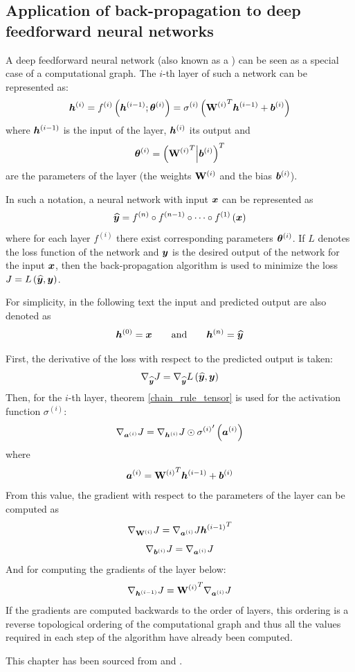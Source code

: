 \begin{example}
\section{Application of back-propagation to deep feedforward neural networks}\label{backprop_application}

A deep feedforward neural network (also known as a ) can be seen as a special case of a computational graph. The \( i \)-th layer of such a network can be represented as:
\[ \bm h^{(i)} = f^{(i)} \left( \bm{h}^{(i - 1)} ; \bm{\theta}^{(i)} \right) = \sigma^{(i)} \left( {\mathbf{W}^{(i)}}^T \bm h^{(i - 1)} + \bm{b}^{(i)} \right) \]
where \( \bm{h}^{(i - 1)} \) is the input of the layer, \( \bm{h}^{(i)} \) its output and
\[ \bm{\theta}^{(i)} = \left( {\mathbf{W}^{(i)}}^T \middle| \bm{b}^{(i)} \right)^T \]
are the parameters of the layer (the weights \( \mathbf{W}^{(i)} \) and the bias \( \bm{b}^{(i)} \)).

In such a notation, a neural network with input \( \bm{x} \) can be represented as
\[ \widehat{\bm{y}} = f^{(n)} \circ f^{(n - 1)} \circ \dots \circ f^{(1)} \left( \bm{x} \right) \]
where for each layer \( f^{(i)} \) there exist corresponding parameters \( \bm{\theta}^{(i)} \). If \( L \) denotes the loss function of the network and \( \bm{y} \) is the desired output of the network for the input \( \bm{x} \), then the back-propagation algorithm is used to minimize the loss \( J = L \left( \widehat{\bm{y}}, \bm{y} \right) \).

For simplicity, in the following text the input and predicted output are also denoted as
\[ \bm{h}^{(0)} = \bm{x} \qquad \text{and} \qquad \bm{h}^{(n)} = \widehat{\bm{y}} \]

First, the derivative of the loss with respect to the predicted output is taken:
\[ \nabla_{\widehat{\bm{y} }} J = \nabla_{\widehat{\bm{y}}} L \left( \widehat{\bm{y}}, \bm{y} \right) \]
Then, for the \( i \)-th layer, theorem \ref{chain_rule_tensor} is used for the activation function \( \sigma^{(i)} \):
\[ \nabla_{\bm{a}^{(i)}} J = \nabla_{\bm{h}^{(i)}} J \odot {\sigma^{(i)}}' \left( \bm{a}^{(i)} \right) \]
where 
\[ \bm{a}^{(i)} = {\mathbf{W}^{(i)}}^T \bm h^{(i - 1)} + \bm{b}^{(i)} \]
From this value, the gradient with respect to the parameters of the layer can be computed as
\[ \nabla_{\mathbf{W}^{(i)}} J = \nabla_{\bm{a}^{(i)}} J {\bm{h}^{(i - 1)}}^T \]
\[ \nabla_{\bm{b}^{(i)}} J = \nabla_{\bm{a}^{(i)}} J \]
And for computing the gradients of the layer below:
\[ \nabla_{\bm{h}^{(i - 1)}} J = {\mathbf{W}^{(i)}}^T \nabla_{\bm{a}^{(i)}} J \]
If the gradients are computed backwards to the order of layers, this ordering is a reverse topological ordering of the computational graph and thus all the values required in each step of the algorithm have already been computed.

This chapter has been sourced from \cite{goodfellow_deep_2016} and \cite{olah_calculus_2015}.
\end{example}
